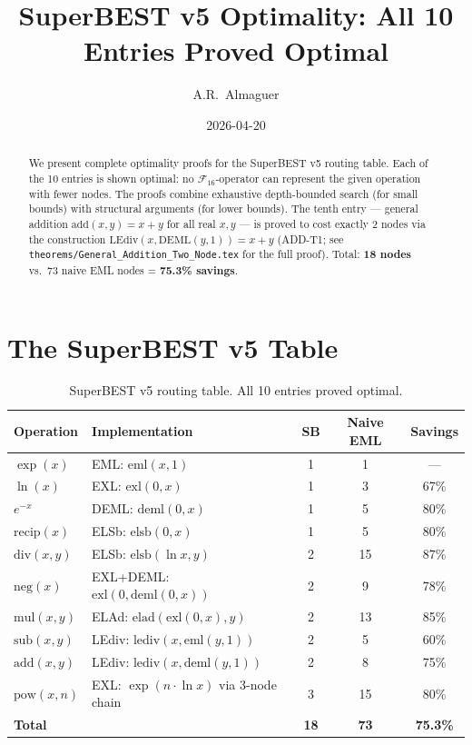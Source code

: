 \documentclass[11pt]{article}
\title{SuperBEST v5 Optimality: All 10 Entries Proved Optimal}
\author{A.R.\ Almaguer}
\date{2026-04-20}
\begin{document}
\maketitle

\begin{abstract}
We present complete optimality proofs for the SuperBEST v5 routing table.
Each of the 10 entries is shown optimal: no $\mathcal{F}_{16}$-operator can
represent the given operation with fewer nodes. The proofs combine exhaustive
depth-bounded search (for small bounds) with structural arguments (for lower
bounds). The tenth entry --- general addition $\mathrm{add}(x,y) = x+y$ for
all real $x, y$ --- is proved to cost exactly 2 nodes via the construction
$\mathrm{LEdiv}(x, \mathrm{DEML}(y,1)) = x + y$ (ADD-T1;
see \texttt{theorems/General\_Addition\_Two\_Node.tex} for the full proof).
Total: \textbf{18 nodes} vs.\ 73 naive EML nodes = \textbf{75.3\% savings}.
\end{abstract}

\section{The SuperBEST v5 Table}

\begin{table}[h]
\centering
\caption{SuperBEST v5 routing table. All 10 entries proved optimal.}
\begin{tabular}{@{}llccc@{}}
\toprule
Operation & Implementation & SB & Naive EML & Savings \\
\midrule
$\exp(x)$           & EML: $\mathrm{eml}(x,1)$                              & 1 & 1  & --- \\
$\ln(x)$            & EXL: $\mathrm{exl}(0,x)$                              & 1 & 3  & 67\% \\
$e^{-x}$            & DEML: $\mathrm{deml}(0,x)$                            & 1 & 5  & 80\% \\
$\mathrm{recip}(x)$ & ELSb: $\mathrm{elsb}(0,x)$                            & 1 & 5  & 80\% \\
$\mathrm{div}(x,y)$ & ELSb: $\mathrm{elsb}(\ln x, y)$                       & 2 & 15 & 87\% \\
$\mathrm{neg}(x)$   & EXL+DEML: $\mathrm{exl}(0,\mathrm{deml}(0,x))$       & 2 & 9  & 78\% \\
$\mathrm{mul}(x,y)$ & ELAd: $\mathrm{elad}(\mathrm{exl}(0,x),y)$           & 2 & 13 & 85\% \\
$\mathrm{sub}(x,y)$ & LEdiv: $\mathrm{lediv}(x,\mathrm{eml}(y,1))$         & 2 & 5  & 60\% \\
$\mathrm{add}(x,y)$ & LEdiv: $\mathrm{lediv}(x,\mathrm{deml}(y,1))$        & 2 & 8  & 75\% \\
$\mathrm{pow}(x,n)$ & EXL: $\exp(n \cdot \ln x)$ via 3-node chain           & 3 & 15 & 80\% \\
\midrule
\textbf{Total} & & \textbf{18} & \textbf{73} & \textbf{75.3\%} \\
\bottomrule
\end{tabular}
\end{table}
\end{document}
